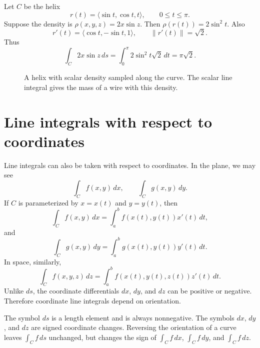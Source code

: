 \documentclass[11pt,oneside]{book}
\newcommand{\norm}[1]{\left\lVert #1\right\rVert}
\begin{document}
\begin{examplebox}
Let $C$ be the helix
\[
r(t)=\langle \sin t,\cos t,t\rangle,\qquad 0\le t\le \pi.
\]
Suppose the density is $\rho(x,y,z)=2x\sin z$. Then $\rho(r(t))=2\sin^2t$. Also
\[
r'(t)=\langle \cos t,-\sin t,1\rangle,\qquad \norm{r'(t)}=\sqrt2.
\]
Thus
\[
\int_C 2x\sin z\,ds
=
\int_0^\pi 2\sin^2t\sqrt2\,dt
=
\pi\sqrt2.
\]
\end{examplebox}

\begin{figure}[H]
\centering
{}
\caption{A helix with scalar density sampled along the curve. The scalar line integral gives the mass of a wire with this density.}
\end{figure}

\section{Line integrals with respect to coordinates}

Line integrals can also be taken with respect to coordinates. In the plane, we may see
\[
\int_C f(x,y)\,dx,\qquad \int_C g(x,y)\,dy.
\]
If $C$ is parameterized by $x=x(t)$ and $y=y(t)$, then
\[
\int_C f(x,y)\,dx=\int_a^b f(x(t),y(t))x'(t)\,dt,
\]
and
\[
\int_C g(x,y)\,dy=\int_a^b g(x(t),y(t))y'(t)\,dt.
\]
In space, similarly,
\[
\int_C f(x,y,z)\,dz=\int_a^b f(x(t),y(t),z(t))z'(t)\,dt.
\]
Unlike $ds$, the coordinate differentials $dx$, $dy$, and $dz$ can be positive or negative. Therefore coordinate line integrals depend on orientation.

\begin{warningbox}
The symbol $ds$ is a length element and is always nonnegative. The symbols $dx$, $dy$, and $dz$ are signed coordinate changes. Reversing the orientation of a curve leaves $\int_C f\,ds$ unchanged, but changes the sign of $\int_C f\,dx$, $\int_C f\,dy$, and $\int_C f\,dz$.
\end{warningbox}
\end{document}
